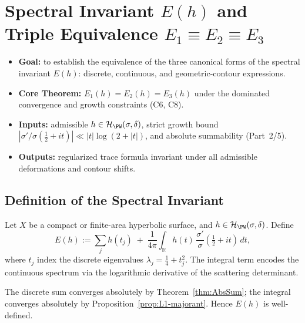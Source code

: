 \section{Spectral Invariant \(E(h)\) and Triple Equivalence \(E_1 \equiv E_2 \equiv E_3\)} \label{sec:spectral-invariant} \relax \hspace{0pt} %

\begin{tcolorbox}[colback=gray!4,colframe=gray!60,title={Scope \& Invariants for Part~3/5}] %
\begin{itemize}
  \item \textbf{Goal:} to establish the equivalence of the three canonical forms of the spectral invariant \(E(h)\): discrete, continuous, and geometric-contour expressions. %
  \item \textbf{Core Theorem:} \(E_1(h)=E_2(h)=E_3(h)\) under the dominated convergence and growth constraints (C6, C8). %
  \item \textbf{Inputs:} admissible \(h\in\mathcal H_{\PW}(\sigma,\delta)\), strict growth bound \(|\sigma'/\sigma(\tfrac12+it)|\ll|t|\log(2+|t|)\), and absolute summability (Part~2/5). %
  \item \textbf{Outputs:} regularized trace formula invariant under all admissible deformations and contour shifts. %
\end{itemize}
\end{tcolorbox}

\subsection{Definition of the Spectral Invariant} \label{subsec:def-Eh} %

\begin{definition} \label{def:Eh} %
Let \(X\) be a compact or finite-area hyperbolic surface, and \(h\in\mathcal H_{\PW}(\sigma,\delta)\). Define
\begin{equation}\label{eq:Eh-def}
  E(h)
  := \sum_{j} h(t_j)
     \;+\; \frac{1}{4\pi}\int_{\mathbb R} h(t)\,\frac{\sigma'}{\sigma}(\tfrac12+it)\,dt, %
\end{equation}
where \(t_j\) index the discrete eigenvalues \(\lambda_j=\tfrac14+t_j^2\). The integral term encodes the continuous spectrum via the logarithmic derivative of the scattering determinant. %
\end{definition}

\begin{remark} %
The discrete sum converges absolutely by Theorem~\ref{thm:AbsSum}; the integral converges absolutely by Proposition~\ref{prop:L1-majorant}. Hence \(E(h)\) is well-defined. %
\end{remark}

